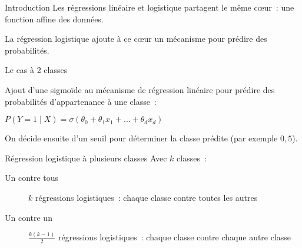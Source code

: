 \begin{frame}{Introduction}
  Les régressions linéaire et logistique partagent le même cœur~: une fonction affine des données.
  
  La régression logistique ajoute à ce cœur un mécanisme pour prédire des probabilités.
\end{frame}

\begin{frame}{Le cas à 2 classes}
  \begin{center}
  \end{center}

  Ajout d'une sigmoïde au mécanisme de régression linéaire pour prédire des probabilités d'appartenance à une classe~: 
  \begin{center}
    $P(Y = 1 \mid X) = \sigma(\theta_0 + \theta_1 x_1 + \dots + \theta_d x_d)$
  \end{center}

  On décide ensuite d'un seuil pour déterminer la classe prédite (par exemple $0,5$).
\end{frame}

\begin{frame}{Régression logistique à plusieurs classes}
  Avec $k$ classes~:

  \begin{description}
  \item[Un contre tous] $k$ régressions logistiques~: chaque classe contre toutes les autres
  \item[Un contre un] $\frac{k(k - 1)}{2}$ régressions logistiques~: chaque classe contre chaque autre classe
  \end{description}
\end{frame}
